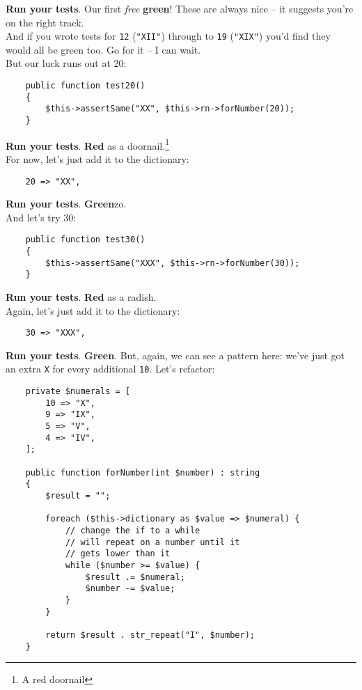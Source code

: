 \textbf{Run your tests}. Our first \textit{free} \textbf{green}! These are always nice – it suggests you're on the right track.
\\

And if you wrote tests for \texttt{12} (\texttt{"XII"}) through to \texttt{19} (\texttt{"XIX"}) you'd find they would all be green too. Go for it – I can wait.
\\

But our luck runs out at 20:

\begin{verbatim}
    public function test20()
    {
        $this->assertSame("XX", $this->rn->forNumber(20));
    }
\end{verbatim}

\textbf{Run your tests}. \textbf{Red} as a doornail.\footnote{A red doornail}
\\

For now, let's just add it to the dictionary:

\begin{verbatim}
    20 => "XX",
\end{verbatim}

\textbf{Run your tests}. \textbf{Green}zo.
\\

And let's try 30:

\begin{verbatim}
    public function test30()
    {
        $this->assertSame("XXX", $this->rn->forNumber(30));
    }
\end{verbatim}

\textbf{Run your tests}. \textbf{Red} as a radish.
\\

Again, let's just add it to the dictionary:

\begin{verbatim}
    30 => "XXX",
\end{verbatim}

\textbf{Run your tests}. \textbf{Green}. But, again, we can see a pattern here: we've just got an extra \texttt{X} for every additional \texttt{10}. Let's refactor:

\begin{verbatim}
    private $numerals = [
        10 => "X",
        9 => "IX",
        5 => "V",
        4 => "IV",
    ];

    public function forNumber(int $number) : string
    {
        $result = "";

        foreach ($this->dictionary as $value => $numeral) {
            // change the if to a while
            // will repeat on a number until it
            // gets lower than it
            while ($number >= $value) {
                $result .= $numeral;
                $number -= $value;
            }
        }

        return $result . str_repeat("I", $number);
    }
\end{verbatim}

